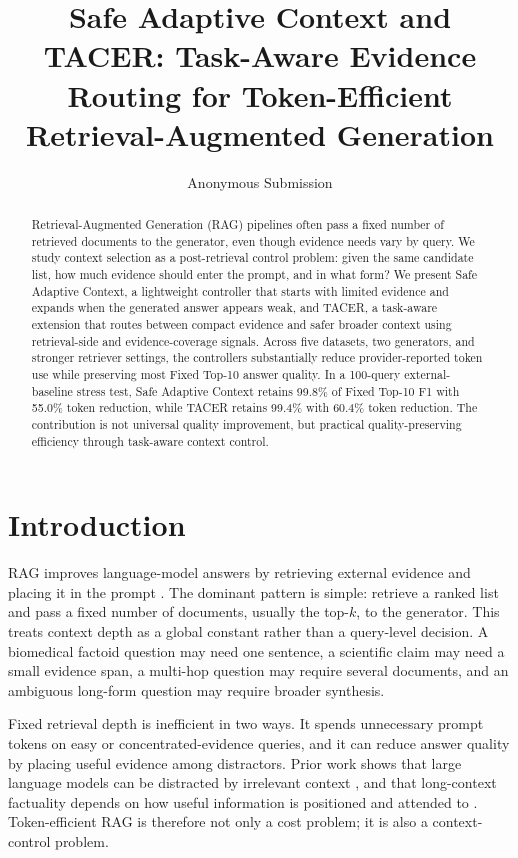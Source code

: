 \documentclass[11pt]{article}
\title{Safe Adaptive Context and TACER: Task-Aware Evidence Routing for Token-Efficient Retrieval-Augmented Generation}
\author{Anonymous Submission}
\begin{document}
\maketitle
\raggedbottom

\begin{abstract}
Retrieval-Augmented Generation (RAG) pipelines often pass a fixed number of retrieved documents to the generator, even though evidence needs vary by query. We study context selection as a post-retrieval control problem: given the same candidate list, how much evidence should enter the prompt, and in what form? We present Safe Adaptive Context, a lightweight controller that starts with limited evidence and expands when the generated answer appears weak, and TACER, a task-aware extension that routes between compact evidence and safer broader context using retrieval-side and evidence-coverage signals. Across five datasets, two generators, and stronger retriever settings, the controllers substantially reduce provider-reported token use while preserving most Fixed Top-10 answer quality. In a 100-query external-baseline stress test, Safe Adaptive Context retains 99.8\% of Fixed Top-10 F1 with 55.0\% token reduction, while TACER retains 99.4\% with 60.4\% token reduction. The contribution is not universal quality improvement, but practical quality-preserving efficiency through task-aware context control.
\end{abstract}

\section{Introduction}

RAG improves language-model answers by retrieving external evidence and placing it in the prompt \citep{lewis2020rag}. The dominant pattern is simple: retrieve a ranked list and pass a fixed number of documents, usually the top-$k$, to the generator. This treats context depth as a global constant rather than a query-level decision. A biomedical factoid question may need one sentence, a scientific claim may need a small evidence span, a multi-hop question may require several documents, and an ambiguous long-form question may require broader synthesis.

Fixed retrieval depth is inefficient in two ways. It spends unnecessary prompt tokens on easy or concentrated-evidence queries, and it can reduce answer quality by placing useful evidence among distractors. Prior work shows that large language models can be distracted by irrelevant context \citep{shi2023distracted}, and that long-context factuality depends on how useful information is positioned and attended to \citep{wu2024retrievalhead}. Token-efficient RAG is therefore not only a cost problem; it is also a context-control problem.
\end{document}
